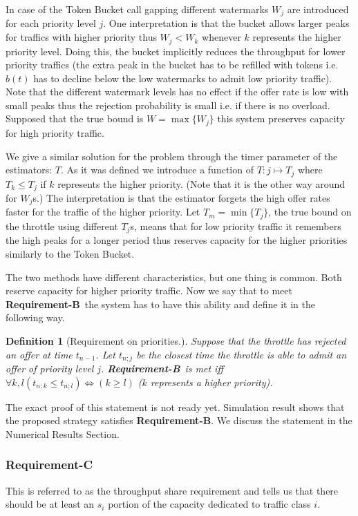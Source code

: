 \documentclass[conference]{IEEEtran}
\newtheorem{definition}{Definition}
\newcommand{\reqB}{\textbf{Requirement-B}}
\begin{document}
In case of the Token Bucket call gapping different watermarks $W_j$
are introduced for each priority level $j$. One interpretation is
that the bucket allows larger peaks for traffics with higher
priority thus $W_j<W_k$ whenever $k$ represents the higher priority
level. Doing this, the bucket implicitly reduces the throughput for
lower priority traffics (the extra peak in the bucket has to be
refilled with tokens i.e. $b(t)$ has to decline below the low
watermarks to admit low priority traffic). Note that the different
watermark levels has no effect if the offer rate is low with small
peaks thus the rejection probability is small i.e. if there is no
overload. Supposed that the true bound is $W=\max\{W_j\}$ this
system preserves capacity for high priority traffic.

We give a similar solution for the problem through the timer
parameter of the estimators: $T$. As it was defined we introduce a
function of $T:j\mapsto T_j$ where $T_k\leq T_j$ if $k$ represents
the higher priority. (Note that it is the other way around for
$W_j$s.) The interpretation is that the estimator forgets the high
offer rates faster for the traffic of the higher priority. Let
$T_m=\min\{T_j\}$, the true bound on the throttle using different
$T_j$s, means that for low priority traffic it remembers the high
peaks for a longer period thus reserves capacity for the higher
priorities similarly to the Token Bucket.

The two methods have different characteristics, but one thing is
common. Both reserve capacity for higher priority traffic. Now we
say that to meet \reqB\ the system has to have this ability and
define it in the following way.

\begin{definition}[Requirement on priorities.]
Suppose that the throttle has rejected an offer at time $t_{n-1}$.
Let $t_{n;j}$ be the closest time the throttle is able to admit an
offer of priority level $j$. \reqB\ is met iff $\forall k,l
(t_{n;k}\leq t_{n;l}) \Leftrightarrow (k\geq l)$ ($k$ represents a
higher priority).
\end{definition}

The exact proof of this statement is not ready yet. Simulation
result shows that the proposed strategy satisfies \reqB. We discuss
the statement in the Numerical Results Section.

\subsubsection{Requirement-C}
This is referred to as the throughput share requirement and tells us
that there should be at least an $s_i$ portion of the capacity
dedicated to traffic class $i$.
\end{document}
